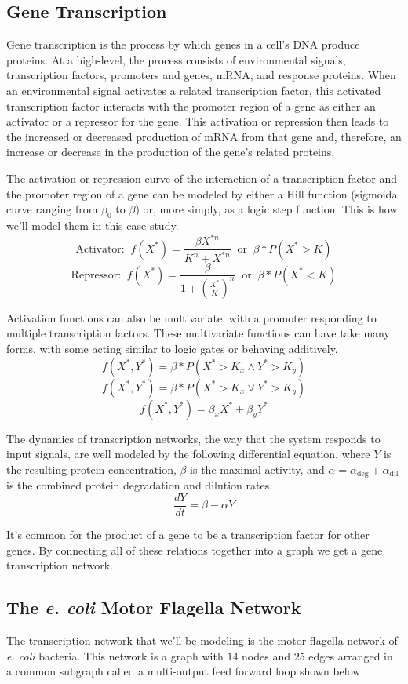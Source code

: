 \documentclass[12pt]{article}
\begin{document}
\subsection*{Gene Transcription}
Gene transcription is the process by which genes in a cell's DNA produce proteins.
At a high-level, the process consists of environmental signals, transcription factors, promoters and genes, mRNA, and response proteins.
When an environmental signal activates a related transcription factor, this activated transcription factor interacts with the promoter region of a gene as either an activator or a repressor for the gene.
This activation or repression then leads to the increased or decreased production of mRNA from that gene and, therefore, an increase or decrease in the production of the gene's related proteins.

The activation or repression curve of the interaction of a transcription factor and the promoter region of a gene can be modeled by either a Hill function (sigmoidal curve ranging from $\beta_0$ to $\beta$) or, more simply, as a logic step function.
This is how we'll model them in this case study.
$$\text{Activator: } \ f(X^*)=\frac{\beta X^{*n}}{K^n + X^{*n}} \ \text{ or } \ \beta * P(X^* > K)$$
$$\text{Repressor: } \ f(X^*)=\frac{\beta}{1 + \left(\frac{X^*}{K}\right)^n} \ \text{ or } \ \beta * P(X^* < K)$$

Activation functions can also be multivariate, with a promoter responding to multiple transcription factors. These multivariate functions can have take many forms, with some acting similar to logic gates or behaving additively.
$$f(X^*, Y^*)=\beta*P(X^* > K_x \land Y^* > K_y)$$
$$f(X^*, Y^*)=\beta*P(X^* > K_x \lor Y^* > K_y)$$
$$f(X^*, Y^*)=\beta_x X^* + \beta_y Y^*$$

The dynamics of transcription networks, the way that the system responds to input signals, are well modeled by the following differential equation, where $Y$ is the resulting protein concentration, $\beta$ is the maximal activity, and $\alpha=\alpha_{\text{deg}} + \alpha_{\text{dil}}$ is the combined protein degradation and dilution rates.
$$\frac{dY}{dt}=\beta - \alpha Y$$

It's common for the product of a gene to be a transcription factor for other genes.
By connecting all of these relations together into a graph we get a gene transcription network.



\subsection*{The \textit{e. coli} Motor Flagella Network}
The transcription network that we'll be modeling is the motor flagella network of \textit{e. coli} bacteria.
This network is a graph with $14$ nodes and $25$ edges arranged in a common subgraph called a multi-output feed forward loop shown below.
\end{document}
